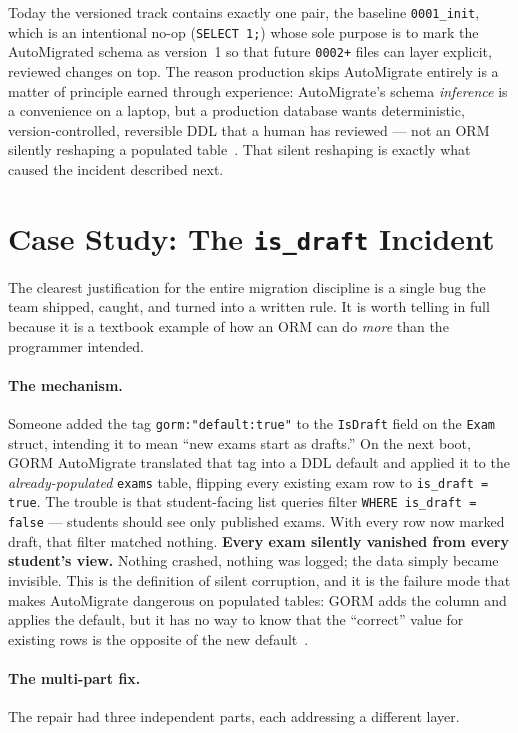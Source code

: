 Today the versioned track contains exactly one pair, the baseline
\texttt{0001\_init}, which is an intentional no-op (\texttt{SELECT 1;}) whose
sole purpose is to mark the AutoMigrated schema as version~1 so that future
\texttt{0002+} files can layer explicit, reviewed changes on top. The reason
production skips AutoMigrate entirely is a matter of principle earned through
experience: AutoMigrate's schema \emph{inference} is a convenience on a
laptop, but a production database wants deterministic, version-controlled,
reversible DDL that a human has reviewed --- not an ORM silently reshaping a
populated table~\cite{twelvefactor}. That silent reshaping is exactly what
caused the incident described next.

\section{Case Study: The \texttt{is\_draft} Incident}\label{sec:incident}

The clearest justification for the entire migration discipline is a single
bug the team shipped, caught, and turned into a written rule. It is worth
telling in full because it is a textbook example of how an ORM can do
\emph{more} than the programmer intended.

\paragraph{The mechanism.} Someone added the tag \texttt{gorm:"default:true"}
to the \texttt{IsDraft} field on the \texttt{Exam} struct, intending it to
mean ``new exams start as drafts.'' On the next boot, GORM AutoMigrate
translated that tag into a DDL default and applied it to the
\emph{already-populated} \texttt{exams} table, flipping every existing exam
row to \texttt{is\_draft = true}. The trouble is that student-facing list
queries filter \texttt{WHERE is\_draft = false} --- students should see only
published exams. With every row now marked draft, that filter matched
nothing. \textbf{Every exam silently vanished from every student's view.}
Nothing crashed, nothing was logged; the data simply became invisible. This
is the definition of silent corruption, and it is the failure mode that makes
AutoMigrate dangerous on populated tables: GORM adds the column and applies
the default, but it has no way to know that the ``correct'' value for
existing rows is the opposite of the new default~\cite{gorm}.

\paragraph{The multi-part fix.} The repair had three independent parts, each
addressing a different layer.

